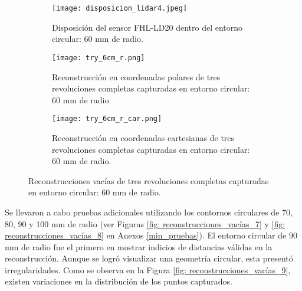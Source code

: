 \begin{figure}[H]
	\centering
	\begin{subfigure}{0.6\textwidth}
		\centering
		\texttt{[image: disposicion\_lidar4.jpeg]}
		\caption{Disposición del sensor FHL-LD20 dentro del entorno circular: 60 mm de radio.}
		\label{disposicion_lidar4}
		\vspace{1em}
	\end{subfigure}
	\begin{subfigure}{0.45\textwidth}
		\centering
		\texttt{[image: try\_6cm\_r.png]}
		\caption{Reconstrucción en coordenadas polares de tres revoluciones completas capturadas en entorno circular: 60 mm de radio.}
		\label{try_6cm_r}
	\end{subfigure}
	\hspace{1em}
	\begin{subfigure}{0.45\textwidth}
		\centering
		\texttt{[image: try\_6cm\_r\_car.png]}
		\caption{Reconstrucción en coordenadas cartesianas de tres revoluciones completas capturadas en entorno circular: 60 mm de radio.}
		\label{try_6cm_r_car}
	\end{subfigure}
	\caption{Reconstrucciones vacías de tres revoluciones completas capturadas en entorno circular: 60 mm de radio.}
	\label{fig: reconstrucciones_vacías_6}
\end{figure}

Se llevaron a cabo pruebas adicionales utilizando los contornos circulares de 70, 80, 90 y 100 mm de radio (ver Figuras \ref{fig: reconstrucciones_vacías_7} y \ref{fig: reconstrucciones_vacías_8} en Anexos \ref{min_pruebas}). El entorno circular de 90 mm de radio fue el primero en mostrar indicios de distancias válidas en la reconstrucción. Aunque se logró visualizar una geometría circular, esta presentó irregularidades. Como se observa en la Figura \ref{fig: reconstrucciones_vacías_9}, existen variaciones en la distribución de los puntos capturados.
 
